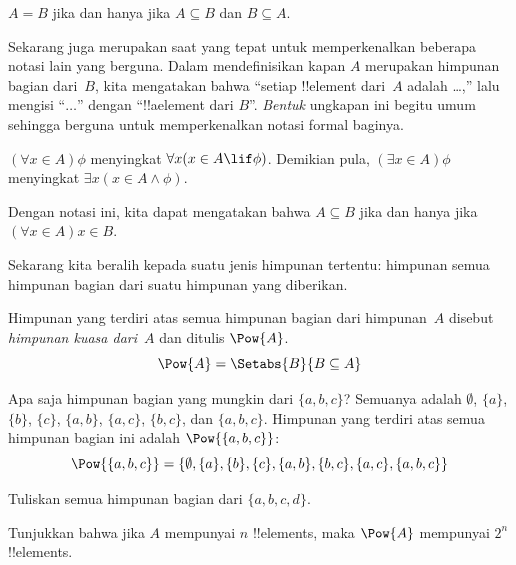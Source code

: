 \documentclass[../../../include/open-logic-section]{subfiles}
\begin{document}
\begin{prop}
$A = B$ jika dan hanya jika $A \subseteq B$ dan $B \subseteq A$.
\end{prop}

Sekarang juga merupakan saat yang tepat untuk memperkenalkan beberapa
notasi lain yang berguna. Dalam mendefinisikan kapan $A$ merupakan
himpunan bagian dari~$B$, kita mengatakan bahwa ``setiap !!{element}
dari~$A$ adalah \dots,'' lalu mengisi ``$\dots$'' dengan
``!!a{element} dari $B$''. \emph{Bentuk} ungkapan ini begitu umum sehingga
berguna untuk memperkenalkan notasi formal baginya.

\begin{defn}
$(\forall x \in A)\phi$ menyingkat $\forall x(x \in A \lif
\phi)$. Demikian pula, $(\exists x \in A)\phi$ menyingkat
$\exists x(x \in A \land \phi)$.
\end{defn}

Dengan notasi ini, kita dapat mengatakan bahwa $A \subseteq B$ jika
dan hanya jika $(\forall x \in A)x \in B$.

Sekarang kita beralih kepada suatu jenis himpunan tertentu: himpunan
semua himpunan bagian dari suatu himpunan yang diberikan.

\begin{defn}
Himpunan yang terdiri atas semua himpunan bagian dari himpunan~$A$
disebut \emph{himpunan kuasa dari}~$A$ dan ditulis $\Pow{A}$.
  \[
    \Pow{A} = \Setabs{B}{B \subseteq A}
  \]
\end{defn}

\begin{ex}
Apa saja himpunan bagian yang mungkin dari $\{ a, b, c \}$? Semuanya
adalah $\emptyset$, $\{a \}$, $\{b\}$, $\{c\}$, $\{a, b\}$,
$\{a, c\}$, $\{b, c\}$, dan $\{a, b, c\}$. Himpunan yang terdiri
atas semua himpunan bagian ini adalah $\Pow{\{a,b,c\}}$:
\[
\Pow{\{ a, b, c \}} = \{\emptyset, \{a \}, \{b\}, \{c\}, \{a, b\},
\{b, c\}, \{a, c\}, \{a, b, c\}\}
\]
\end{ex}

\begin{prob}
Tuliskan semua himpunan bagian dari $\{a, b, c, d\}$.
\end{prob}

\begin{prob}
Tunjukkan bahwa jika $A$ mempunyai $n$ !!{element}s, maka $\Pow{A}$
mempunyai $2^n$ !!{element}s.
\end{prob}
\end{document}
